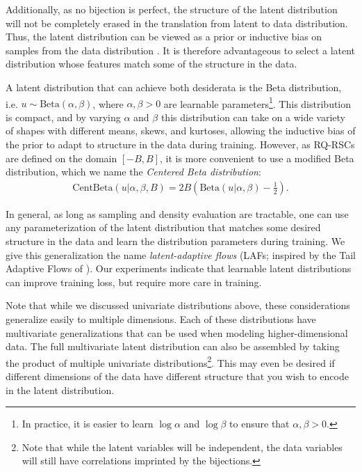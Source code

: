 \documentclass[twocolumn,twocolappendix]{aastex631}
\begin{document}
Additionally, as no bijection is perfect, the structure of the latent distribution will not be completely erased in the translation from latent to data distribution.
Thus, the latent distribution can be viewed as a prior or inductive bias on samples from the data distribution \citep{jaini2020}.
It is therefore advantageous to select a latent distribution whose features match some of the structure in the data.

A latent distribution that can achieve both desiderata is the Beta distribution, i.e. $u \sim \mathrm{Beta}(\alpha, \beta)$, where $\alpha, \beta > 0$ are learnable parameters\footnote{In practice, it is easier to learn $\log\alpha$ and $\log\beta$ to ensure that $\alpha, \beta > 0$.}.
This distribution is compact, and by varying $\alpha$ and $\beta$ this distribution can take on a wide variety of shapes with different means, skews, and kurtoses, allowing the inductive bias of the prior to adapt to structure in the data during training.
However, as RQ-RSCs are defined on the domain $[-B, B]$, it is more convenient to use a modified Beta distribution, which we name the \emph{Centered Beta distribution}:
\begin{align}
    \text{CentBeta}(u | \alpha, \beta, B) = 2B\left(\text{Beta}(u|\alpha, \beta) - \frac{1}{2}\right).
\end{align}

In general, as long as sampling and density evaluation are tractable, one can use any parameterization of the latent distribution that matches some desired structure in the data and learn the distribution parameters during training.
We give this generalization the name \emph{latent-adaptive flows} (LAFs; inspired by the Tail Adaptive Flows of \citealt{jaini2020}).
Our experiments indicate that learnable latent distributions can improve training loss, but require more care in training.

Note that while we discussed univariate distributions above, these considerations generalize easily to multiple dimensions.
Each of these distributions have multivariate generalizations that can be used when modeling higher-dimensional data.
The full multivariate latent distribution can also be assembled by taking the product of multiple univariate distributions\footnote{Note that while the latent variables will be independent, the data variables will still have correlations imprinted by the bijections.}.
This may even be desired if different dimensions of the data have different structure that you wish to encode in the latent distribution.
\end{document}

